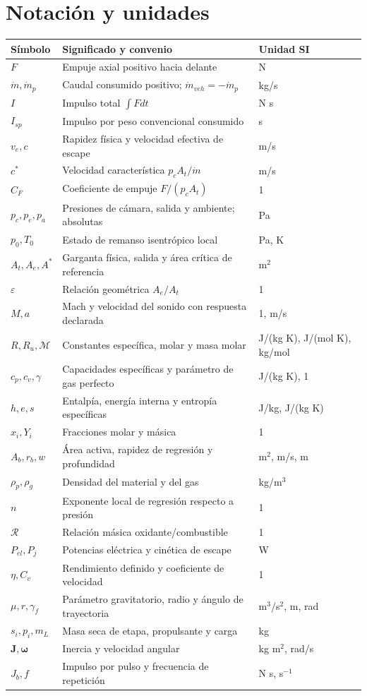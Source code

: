 \appendix
\chapter{Notación y unidades}\label{app:notation}
\begin{longtable}{p{.18\linewidth}p{.53\linewidth}p{.20\linewidth}}
\toprule Símbolo & Significado y convenio & Unidad SI\\\midrule\endhead
$F$ & Empuje axial positivo hacia delante & N\\
$\dot m,\dot m_p$ & Caudal consumido positivo; $\dot m_{veh}=-\dot m_p$ & kg/s\\
$I$ & Impulso total $\int Fdt$ & N s\\
$I_{sp}$ & Impulso por peso convencional consumido & s\\
$v_e,c$ & Rapidez física y velocidad efectiva de escape & m/s\\
$c^*$ & Velocidad característica $p_cA_t/\dot m$ & m/s\\
$C_F$ & Coeficiente de empuje $F/(p_cA_t)$ & 1\\
$p_c,p_e,p_a$ & Presiones de cámara, salida y ambiente; absolutas & Pa\\
$p_0,T_0$ & Estado de remanso isentrópico local & Pa, K\\
$A_t,A_e,A^*$ & Garganta física, salida y área crítica de referencia & m$^2$\\
$\varepsilon$ & Relación geométrica $A_e/A_t$ & 1\\
$M,a$ & Mach y velocidad del sonido con respuesta declarada & 1, m/s\\
$R,R_u,\mathcal M$ & Constantes específica, molar y masa molar & J/(kg K), J/(mol K), kg/mol\\
$c_p,c_v,\gamma$ & Capacidades específicas y parámetro de gas perfecto & J/(kg K), 1\\
$h,e,s$ & Entalpía, energía interna y entropía específicas & J/kg, J/(kg K)\\
$x_i,Y_i$ & Fracciones molar y másica & 1\\
$A_b,r_b,w$ & Área activa, rapidez de regresión y profundidad & m$^2$, m/s, m\\
$\rho_p,\rho_g$ & Densidad del material y del gas & kg/m$^3$\\
$n$ & Exponente local de regresión respecto a presión & 1\\
$\mathcal R$ & Relación másica oxidante/combustible & 1\\
$P_{el},P_j$ & Potencias eléctrica y cinética de escape & W\\
$\eta,C_v$ & Rendimiento definido y coeficiente de velocidad & 1\\
$\mu,r,\gamma_f$ & Parámetro gravitatorio, radio y ángulo de trayectoria & m$^3$/s$^2$, m, rad\\
$s_i,p_i,m_L$ & Masa seca de etapa, propulsante y carga & kg\\
$\mathbf J,\boldsymbol\omega$ & Inercia y velocidad angular & kg m$^2$, rad/s\\
$J_b,f$ & Impulso por pulso y frecuencia de repetición & N s, s$^{-1}$\\
\bottomrule
\end{longtable}

